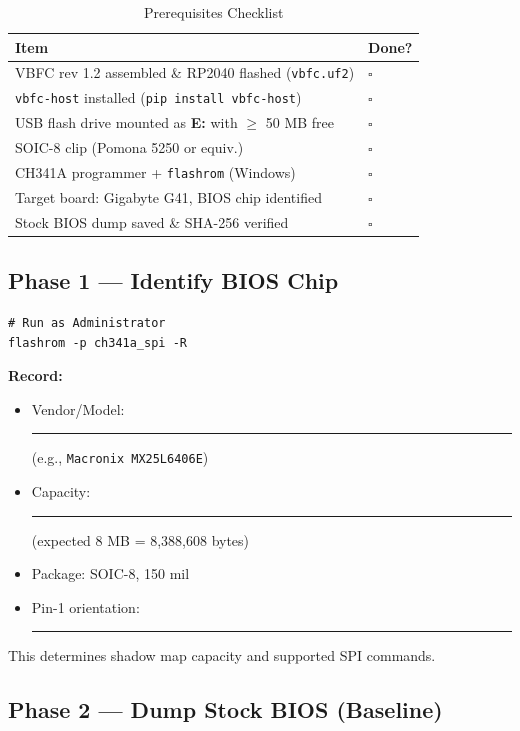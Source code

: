 \begin{table}[h]
\centering
\caption{Prerequisites Checklist}
\label{tab:prereqs}
\begin{tabular}{@{}ll@{}}
\toprule
\textbf{Item} & \textbf{Done?} \\
\midrule
VBFC rev 1.2 assembled \& RP2040 flashed (\texttt{vbfc.uf2}) & $\square$ \\
\texttt{vbfc-host} installed (\texttt{pip install vbfc-host}) & $\square$ \\
USB flash drive mounted as \textbf{E:} with $\ge$ 50 MB free & $\square$ \\
SOIC-8 clip (Pomona 5250 or equiv.) & $\square$ \\
CH341A programmer + \texttt{flashrom} (Windows) & $\square$ \\
Target board: Gigabyte G41, BIOS chip identified & $\square$ \\
Stock BIOS dump saved \& SHA-256 verified & $\square$ \\
\bottomrule
\end{tabular}
\end{table}

\subsection*{Phase 1 — Identify BIOS Chip}

\begin{lstlisting}[style=vbfcStyle, caption={Identify BIOS Chip}]
# Run as Administrator
flashrom -p ch341a_spi -R
\end{lstlisting}

\textbf{Record:}
\begin{itemize}
    \item Vendor/Model: \rule{5cm}{0.4pt} (e.g., \texttt{Macronix MX25L6406E})
    \item Capacity: \rule{5cm}{0.4pt} (expected 8 MB = 8,388,608 bytes)
    \item Package: SOIC-8, 150 mil
    \item Pin-1 orientation: \rule{5cm}{0.4pt}
\end{itemize}

This determines shadow map capacity and supported SPI commands.

\subsection*{Phase 2 — Dump Stock BIOS (Baseline)}

